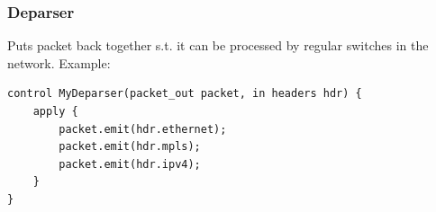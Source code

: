 \subsubsection{Deparser}
Puts packet back together s.t. it can be processed by regular switches in the network. Example: %

\begin{lstlisting}
control MyDeparser(packet_out packet, in headers hdr) {
    apply {
        packet.emit(hdr.ethernet);
        packet.emit(hdr.mpls);
        packet.emit(hdr.ipv4);
    }
}
\end{lstlisting}